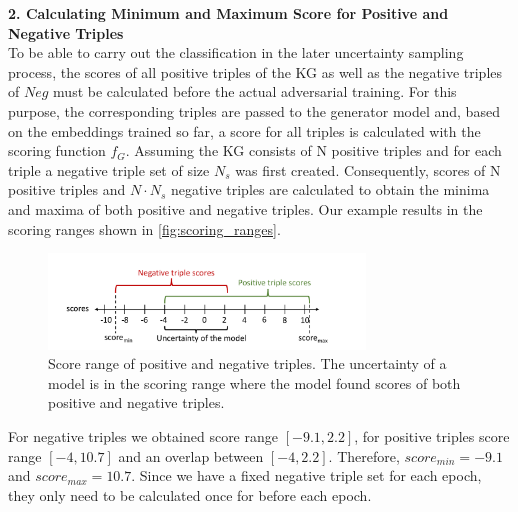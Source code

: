 \textbf{2. Calculating Minimum and Maximum Score for Positive and Negative Triples}\\

To be able to carry out the classification in the later uncertainty sampling process, the scores of all positive triples of the \ac{KG} as well as the negative triples of $Neg$ must be calculated before the actual adversarial training.
For this purpose, the corresponding triples are passed to the generator model and, based on the embeddings trained so far, a score for all triples is calculated with the scoring function $f_G$.
Assuming the \ac{KG} consists of N positive triples and for each triple a negative triple set of size $N_s$ was first created. 
Consequently, scores of N positive triples and $N \cdot N_s$ negative triples are calculated to obtain the minima and maxima of both positive and negative triples.
Our example results in the scoring ranges shown in \autoref{fig:scoring_ranges}.
\begin{figure}[t]
  \centering
    \includegraphics[width=0.75\textwidth]{figures/scoremin_scoremax_example.pdf}
  \caption{Score range of positive and negative triples.
  The uncertainty of a model is in the scoring range where the 
  model found scores of both positive and negative triples.}
  \label{fig:scoring_ranges}
\end{figure}
For negative triples we obtained score range $[-9.1, 2.2]$, for positive triples score range $[-4, 10.7]$ and an overlap between $[-4, 2.2]$.
Therefore, $score_{min} = -9.1$ and $score_{max} = 10.7$.
Since we have a fixed negative triple set for each epoch, they only need to be calculated once for before each epoch.